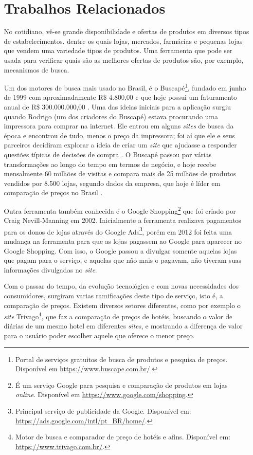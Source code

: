 \section{Trabalhos Relacionados}
\label{sec:trabalhos-relacionados}

No cotidiano, vê-se grande disponibilidade e ofertas de produtos em diversos tipos de estabelecimentos, dentre os quais lojas, mercados, farmácias e pequenas lojas que vendem uma variedade tipos de produtos. Uma ferramenta que pode ser usada para verificar quais são as melhores ofertas de produtos são, por exemplo, mecanismos de busca.

Um dos motores de busca mais usado no Brasil, é o Buscapé\footnote{Portal de serviços gratuitos de busca de produtos e pesquisa de preços. Disponível em \url{https://www.buscape.com.br/}.}, fundado em junho de 1999 com aproximadamente R\$ 4.800,00 e que hoje possui um faturamento anual de R\$ 300.000.000,00 \cite{EmídiaFelipe2017BUSCAPÉ}. Uma das ideias iniciais para a aplicação surgiu quando Rodrigo (um dos criadores do Buscapé) estava procurando uma impressora para comprar na internet. Ele entrou em alguns \textit{sites} de busca da época e encontrou de tudo, menos o preço da impressora; foi aí que ele e seus parceiros decidiram explorar a ideia de criar um \textit{site} que ajudasse a responder questões típicas de decisões de compra \cite{Arruda2011Buscapé}. O Buscapé passou por várias transformações ao longo do tempo em termos de negócio, e hoje recebe mensalmente 60 milhões de visitas e compara mais de 25 milhões de produtos vendidos por 8.500 lojas, segundo dados da empresa, que hoje é líder em comparação de preços no Brasil \cite{Heloísa2017Startups}.

Outra ferramenta também conhecida é o Google Shopping\footnote{É um serviço Google para pesquisa e comparação de produtos em lojas \textit{online}. Disponível em \url{https://www.google.com/shopping}.} que foi criado por Craig Nevill-Manning em 2002. Inicialmente a ferramenta realizava pagamentos para os donos de lojas através do Google Ads\footnote{Principal serviço de publicidade da Google. Disponível em: \url{https://ads.google.com/intl/pt_BR/home/}.}, porém em 2012 foi feita uma mudança na ferramenta para que as lojas pagassem ao Google para aparecer no Google Shopping. Com isso, o Google passou a divulgar somente aquelas lojas que pagam para o serviço, e aquelas que não mais o pagavam, não tiveram suas informações divulgadas no \textit{site}.

Com o passar do tempo, da evolução tecnológica e com novas necessidades dos consumidores, surgiram varias ramificações deste tipo de serviço, isto é, a comparação de preços. Existem diversos setores diferentes, como por exemplo o \textit{site} Trivago\footnote{Motor de busca e comparador de preço de hotéis e afins. Disponível em: \url{https://www.trivago.com.br/}.}, que faz a comparação de preços de hotéis, buscando o valor de diárias de um mesmo hotel em diferentes \textit{sites}, e mostrando a diferença de valor para o usuário poder escolher aquele que oferece o menor preço.

